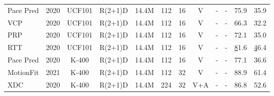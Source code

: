\documentclass[10pt,twocolumn,letterpaper]{article}
\begin{document}
\begin{table*}
\begin{center}
{\begin{tabular}{lccccccccccc}
Pace Pred \cite{wang_self-supervised_2020}  & 2020                        & UCF101                         & R(2+1)D                         & 14.4M                        & 112                        & 16                        & V      &	-	 &     -     & 75.9                        & 35.9                        \\
VCP \cite{luo_video_2020}   				& 2020                        & UCF101                         & R(2+1)D                         & 14.4M                        & 112                        & 16                        & V      &	-	 &      -    & 66.3                        & 32.2                        \\
PRP \cite{yao_video_2020}   				& 2020                        & UCF101                         & R(2+1)D                         & 14.4M                        & 112                        & 16                        & V      &	-	 &    -      & 72.1                        & 35.0                        \\
RTT \cite{jenni_video_2020}  				& 2020                        & UCF101                         & R(2+1)D                         & 14.4M                        & 112                        & 16                        & V       &	-	 &   -       & {\ul 81.6}                        & {\ul 46.4}                        \\
{\color[HTML]{9B9B9B} Pace Pred \cite{wang_self-supervised_2020}}   & {\color[HTML]{9B9B9B} 2020} & {\color[HTML]{9B9B9B} K-400} & {\color[HTML]{9B9B9B} R(2+1)D}  & {\color[HTML]{9B9B9B} 14.4M} & {\color[HTML]{9B9B9B} 112} & {\color[HTML]{9B9B9B} 16} & {\color[HTML]{9B9B9B} V}  &	-	 &        -   & {\color[HTML]{9B9B9B} 77.1} & {\color[HTML]{9B9B9B} 36.6} \\
{\color[HTML]{9B9B9B} MotionFit
\cite{gavrilyuk_motion-augmented_2021}}    & {\color[HTML]{9B9B9B} 2021}  & {\color[HTML]{9B9B9B} K-400} & {\color[HTML]{9B9B9B} R(2+1)D}  & {\color[HTML]{9B9B9B} 14.4M} & {\color[HTML]{9B9B9B} 112} & {\color[HTML]{9B9B9B} 32} & {\color[HTML]{9B9B9B} V}  &  {\color[HTML]{9B9B9B} -} & {\color[HTML]{9B9B9B} -} & {\color[HTML]{9B9B9B} 88.9} & {\color[HTML]{9B9B9B} 61.4} \\
{\color[HTML]{9B9B9B} XDC \cite{alwassel_self-supervised_2020}}     & {\color[HTML]{9B9B9B} 2020} & {\color[HTML]{9B9B9B} K-400} & {\color[HTML]{9B9B9B} R(2+1)D}  & {\color[HTML]{9B9B9B} 14.4M} & {\color[HTML]{9B9B9B} 224} & {\color[HTML]{9B9B9B} 32} & {\color[HTML]{9B9B9B} V+A} &	-	 &      -    & {\color[HTML]{9B9B9B} 86.8} & {\color[HTML]{9B9B9B} 52.6} \\

\end{tabular}}
\end{center}
\end{table*}
\end{document}

